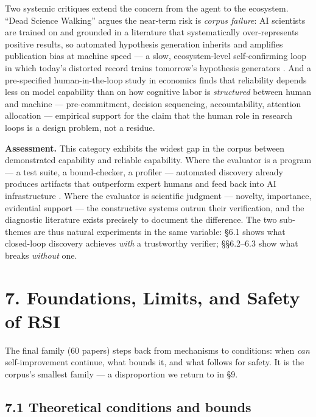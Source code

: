 \documentclass[
  11pt,
]{article}
\begin{document}
Two systemic critiques extend the concern from the agent to the
ecosystem. ``Dead Science Walking'' argues the near-term risk is
\emph{corpus failure}: AI scientists are trained on and grounded in a
literature that systematically over-represents positive results, so
automated hypothesis generation inherits and amplifies publication bias
at machine speed --- a slow, ecosystem-level self-confirming loop in
which today's distorted record trains tomorrow's hypothesis generators
\citep{chauhan2026dead}. And a pre-specified human-in-the-loop study in
economics finds that reliability depends less on model capability than
on how cognitive labor is \emph{structured} between human and machine
--- pre-commitment, decision sequencing, accountability, attention
allocation \citep{zhu2026human} --- empirical support for the claim that
the human role in research loops is a design problem, not a residue.

\textbf{Assessment.} This category exhibits the widest gap in the corpus
between demonstrated capability and reliable capability. Where the
evaluator is a program --- a test suite, a bound-checker, a profiler ---
automated discovery already produces artifacts that outperform expert
humans and feed back into AI infrastructure
\citep{novikov2025alphaevolve}. Where the evaluator is scientific
judgment --- novelty, importance, evidential support --- the
constructive systems outrun their verification, and the diagnostic
literature exists precisely to document the difference. The two
sub-themes are thus natural experiments in the same variable: §6.1 shows
what closed-loop discovery achieves \emph{with} a trustworthy verifier;
§§6.2--6.3 show what breaks \emph{without} one.

\section{7. Foundations, Limits, and Safety of
RSI}\label{foundations-limits-and-safety-of-rsi}

The final family (60 papers) steps back from mechanisms to conditions:
when \emph{can} self-improvement continue, what bounds it, and what
follows for safety. It is the corpus's smallest family --- a
disproportion we return to in §9.

\subsection{7.1 Theoretical conditions and
bounds}\label{theoretical-conditions-and-bounds}
\end{document}

